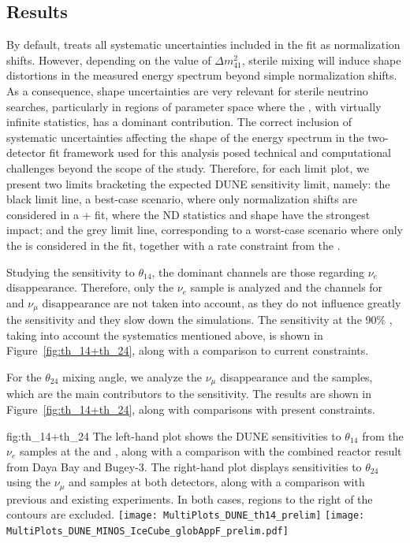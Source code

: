 \subsection{Results}
By default,  treats all systematic uncertainties included in the fit as normalization shifts. However, depending on the value of $\Delta m^2_{41}$, sterile mixing will induce shape distortions in the measured energy spectrum beyond simple normalization shifts. As a consequence, shape uncertainties are very relevant for sterile neutrino searches, particularly in regions of parameter space where the , with virtually infinite statistics, has a dominant contribution. The correct inclusion of systematic uncertainties affecting the shape of the energy spectrum in the two-detector fit  framework used for this analysis posed technical and computational challenges beyond the scope of the study.
Therefore, for each limit plot, we present two limits bracketing the expected DUNE sensitivity limit, namely: the black limit line, a best-case scenario, where only normalization shifts are considered in a + fit, where the ND statistics and shape have the strongest impact; and the grey limit line, corresponding to a worst-case scenario where only the  is considered in the fit, together with a rate constraint from the . 

Studying the sensitivity to $\theta_{14}$, the dominant channels are those regarding $\nu_e$ disappearance. Therefore, only the $\nu_e$  sample is analyzed and the channels for  and $\nu_{\mu}$  disappearance are not taken into account, as they do not influence greatly the sensitivity and they slow down the simulations. The sensitivity at the 90\% , taking into account the systematics mentioned above, is shown in Figure~\ref{fig:th_14+th_24}, along with a comparison to current constraints.

For the $\theta_{24}$ mixing angle, we analyze the $\nu_{\mu}$  disappearance and the  samples, which are the main contributors to the sensitivity. 
The results are shown in Figure~\ref{fig:th_14+th_24}, along with comparisons with present constraints.

\begin{dunefigure} %
{fig:th_14+th_24}
{The left-hand plot shows the DUNE sensitivities to $\theta_{14}$ from the $\nu_e$  samples at the  and , along with a comparison with the combined reactor result from Daya Bay and Bugey-3. The right-hand plot displays sensitivities to $\theta_{24}$ using the $\nu_\mu$  and  samples at both detectors, along with a comparison with previous and existing experiments. In both cases, regions to the right of the contours are excluded.}
\texttt{[image: MultiPlots\_DUNE\_th14\_prelim]}
\texttt{[image: MultiPlots\_DUNE\_MINOS\_IceCube\_globAppF\_prelim.pdf]}
\end{dunefigure}


